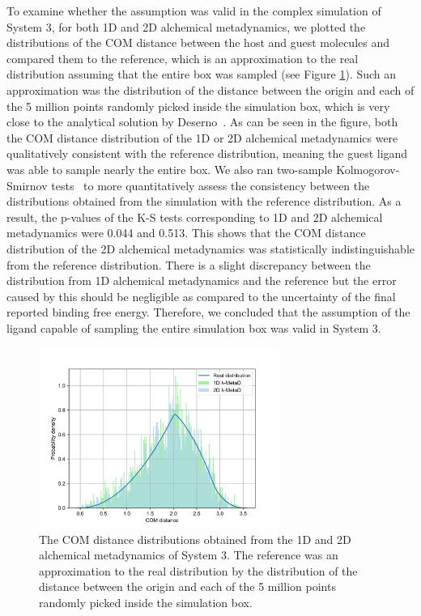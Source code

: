 \documentclass[journal=jacsat,manuscript=article]{achemso}
\begin{document}
To examine whether the assumption was valid in the complex simulation of System 3, for both 1D and 2D alchemical metadynamics, we plotted the distributions of the COM distance between the host and guest molecules and compared them to the reference, which is an approximation to the real distribution assuming that the entire box was sampled (see Figure \ref{pair_correlation}). Such an approximation was the distribution of the distance between the origin and each of the 5 million points randomly picked inside the simulation box, which is very close to the analytical solution by Deserno~\cite{deserno2004pair}. As can be seen in the figure, both the COM distance distribution of the 1D or 2D alchemical metadynamics were qualitatively consistent with the reference distribution, meaning the guest ligand was able to sample nearly the entire box. We also ran two-sample Kolmogorov-Smirnov tests~\cite{kolmogorov1933sulla} to more quantitatively assess the consistency between the distributions obtained from the simulation with the reference distribution. As a result, the p-values of the K-S tests corresponding to 1D and 2D alchemical metadynamics were 0.044 and 0.513. This shows that the COM distance distribution of the 2D alchemical metadynamics was statistically indistinguishable from the reference distribution. There is a slight discrepancy between the distribution from 1D alchemical metadynamics and the reference but the error caused by this should be negligible as compared to the uncertainty of the final reported binding free energy. Therefore, we concluded that the assumption of the ligand capable of sampling the entire simulation box was valid in System 3. 

\renewcommand{\thefigure}{S\arabic{figure}}
\begin{figure}[H]
    \centering
    \includegraphics[width=0.7\textwidth]{Figures/pair_correlation_fitting}   
    \caption{The COM distance distributions obtained from the 1D and 2D alchemical metadynamics of System 3. The reference was an approximation to the real distribution by the distribution of the distance between the origin and each of the 5 million points randomly picked inside the simulation box.}
    \label{pair_correlation}
\end{figure}
\end{document}
